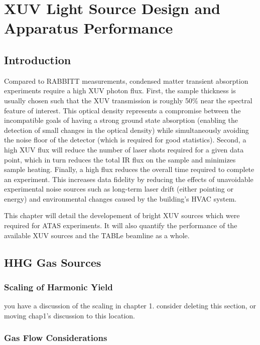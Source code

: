 \chapter{XUV Light Source Design and Apparatus Performance}

\section{Introduction}

Compared to RABBITT measurements, condensed matter transient absorption experiments require a high XUV photon flux. First, the sample thickness is usually chosen such that the XUV transmission is roughly 50\% near the spectral feature of interest. This optical density represents a compromise between the incompatible goals of having a strong ground state absorption (enabling the detection of small changes in the optical density) while simultaneously avoiding the noise floor of the detector (which is required for good statistics). Second, a high XUV flux will reduce the number of laser shots required for a given data point, which in turn reduces the total IR flux on the sample and minimizes sample heating. Finally, a high flux reduces the overall time required to complete an experiment. This increases data fidelity by reducing the effects of unavoidable experimental noise sources such as long-term laser drift (either pointing or energy) and environmental changes caused by the building's HVAC system.

This chapter will detail the developement of bright XUV sources which were required for ATAS experiments. It will also quantify the performance of the available XUV sources and the TABLe beamline as a whole.

\section{HHG Gas Sources}

\subsection{Scaling of Harmonic Yield}

you have a discussion of the scaling in chapter 1. consider deleting this section, or moving chap1's discussion to this location.

\subsection{Gas Flow Considerations}

